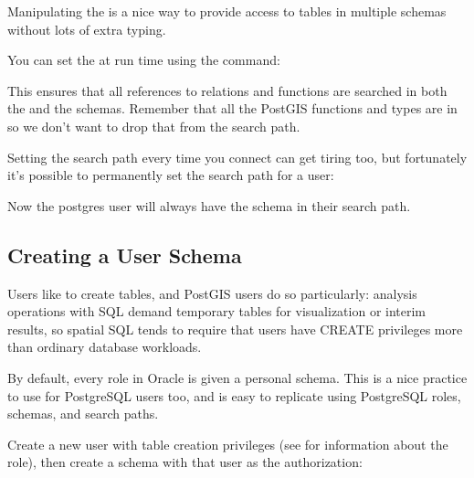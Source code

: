\documentclass[a4paper,11pt,english]{sphinxmanual}
\begin{document}
Manipulating the  is a nice way to provide access to tables in multiple schemas without lots of extra typing.

You can set the  at run time using the  command:

\begin{sphinxVerbatim}[commandchars=\\\{\}]
    
\end{sphinxVerbatim}

This ensures that all references to relations and functions are searched in both the  and the  schemas. Remember that all the PostGIS functions and types are in  so we don’t want to drop that from the search path.

Setting the search path every time you connect can get tiring too, but fortunately it’s possible to permanently set the search path for a user:

\begin{sphinxVerbatim}[commandchars=\\\{\}]
       
\end{sphinxVerbatim}

Now the postgres user will always have the  schema in their search path.


\subsection{Creating a User Schema}
\label{\detokenize{maintenance:creating-a-user-schema}}
Users like to create tables, and PostGIS users do so particularly: analysis operations with SQL demand temporary tables for visualization or interim results, so spatial SQL tends to require that users have CREATE privileges more than ordinary database workloads.

By default, every role in Oracle is given a personal schema. This is a nice practice to use for PostgreSQL users too, and is easy to replicate using PostgreSQL roles, schemas, and search paths.

Create a new user with table creation privileges (see  for information about the  role), then create a schema with that user as the authorization:
\end{document}
